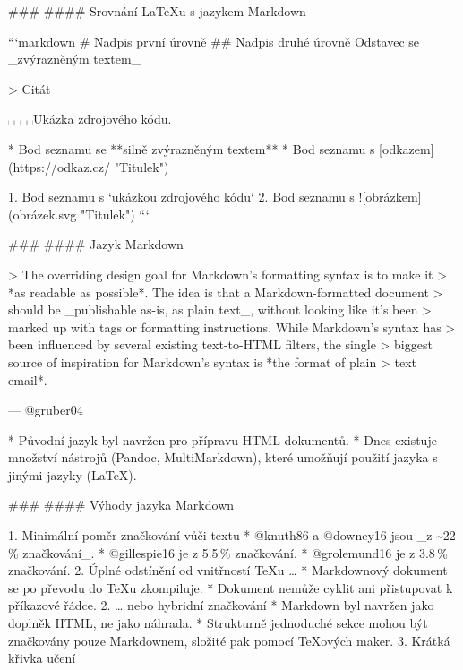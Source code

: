 \documentclass{beamer}
\begin{document}
\begin{frame}

### \subsecname
#### Srovnání \LaTeX u s jazykem Markdown

```markdown
# Nadpis první úrovně
## Nadpis druhé úrovně
Odstavec se _zvýrazněným textem_

> Citát

␣␣␣␣Ukázka zdrojového kódu.

* Bod seznamu se **silně zvýrazněným textem**
* Bod seznamu s [odkazem](https://odkaz.cz/ "Titulek")

1. Bod seznamu s `ukázkou zdrojového kódu`
2. Bod seznamu s ![obrázkem](obrázek.svg "Titulek")
```

\end{frame}
\begin{frame}

### \subsecname
#### Jazyk Markdown

> The overriding design goal for Markdown’s formatting syntax is to make it
> *as readable as possible*. The idea is that a Markdown-formatted document
> should be _publishable as-is, as plain text_, without looking like it’s been
> marked up with tags or formatting instructions. While Markdown’s syntax has
> been influenced by several existing text-to-HTML filters, the single
> biggest source of inspiration for Markdown’s syntax is *the format of plain
> text email*.

\hfill --- @gruber04

  * Původní jazyk byl navržen pro přípravu HTML dokumentů.
  * Dnes existuje množství nástrojů (Pandoc, MultiMarkdown), které umožňují
    použití jazyka s jinými jazyky (\LaTeX).

\end{frame}
\begin{frame}

### \subsecname
#### Výhody jazyka Markdown

  1. Minimální poměr značkování vůči textu
    * @knuth86 a @downey16 jsou _z \textasciitilde 22\,\% značkování_.
    * @gillespie16 je z 5.5\,\% značkování.
    * @grolemund16 je z 3.8\,\% značkování.
  2. Úplné odstínění od vnitřností \TeX u …
    * Markdownový dokument se po převodu do \TeX u zkompiluje.
    * Dokument nemůže cyklit ani přistupovat k příkazové řádce.
  2. … nebo hybridní značkování
    * Markdown byl navržen jako doplněk HTML, ne jako náhrada.
    * Strukturně jednoduché sekce mohou být značkovány pouze Markdownem,
      složité pak pomocí \TeX ových maker.
  3. Krátká křivka učení

\end{frame}
\end{document}
